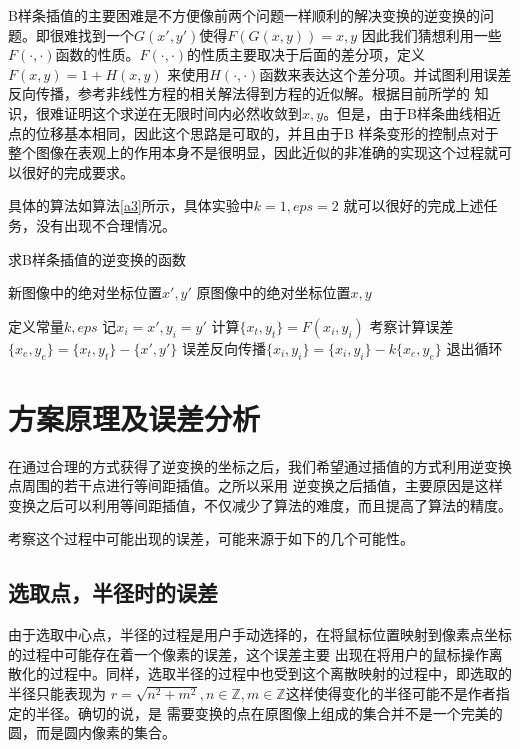 \documentclass[UTF8,a4paper]{paper}
\begin{document}
B样条插值的主要困难是不方便像前两个问题一样顺利的解决变换的逆变换的问题。即很难找到一个$G(x',y')$使得$F(G(x,y)) = x,y$
因此我们猜想利用一些$F(\cdot,\cdot)$函数的性质。$F(\cdot,\cdot)$的性质主要取决于后面的差分项，定义$F(x,y) = 1 + H(x,y)$
来使用$H(\cdot,\cdot)$函数来表达这个差分项。并试图利用误差反向传播，参考非线性方程的相关解法得到方程的近似解。根据目前所学的
知识，很难证明这个求逆在无限时间内必然收敛到$x,y$。但是，由于B样条曲线相近点的位移基本相同，因此这个思路是可取的，并且由于B
样条变形的控制点对于整个图像在表观上的作用本身不是很明显，因此近似的非准确的实现这个过程就可以很好的完成要求。

具体的算法如算法\ref{a3}所示，具体实验中$k = 1,eps = 2$ 就可以很好的完成上述任务，没有出现不合理情况。
\begin{algorithm}[h]\caption{求B样条插值的逆变换的函数}\label{a3}\begin{algorithmic}
    \Require 新图像中的绝对坐标位置$x',y'$
    \Ensure 原图像中的绝对坐标位置$x,y$\end{algorithmic}\begin{algorithmic}[1]
    \State 定义常量$k,eps$
    \State 记$x_i = x',y_i = y'$
    \State 计算$\{x_t,y_t\} = F(x_i,y_i)$
    \State 考察计算误差$\{x_e,y_e\} = \{x_t,y_t\} - \{x',y'\}$
    \State 误差反向传播$\{x_i,y_i\} = \{x_i,y_i\} - k\{x_e,y_e\}$
        \State 退出循环
    \EndIf
    \EndFor
    \EndFunction
\end{algorithmic}\end{algorithm}
\section{方案原理及误差分析}
在通过合理的方式获得了逆变换的坐标之后，我们希望通过插值的方式利用逆变换点周围的若干点进行等间距插值。之所以采用
逆变换之后插值，主要原因是这样变换之后可以利用等间距插值，不仅减少了算法的难度，而且提高了算法的精度。

考察这个过程中可能出现的误差，可能来源于如下的几个可能性。
\subsection{选取点，半径时的误差}
由于选取中心点，半径的过程是用户手动选择的，在将鼠标位置映射到像素点坐标的过程中可能存在着一个像素的误差，这个误差主要
出现在将用户的鼠标操作离散化的过程中。同样，选取半径的过程中也受到这个离散映射的过程中，即选取的半径只能表现为
$r = \sqrt{n^2 + m^2},n \in \mathbb{Z}, m \in\mathbb{Z}$这样使得变化的半径可能不是作者指定的半径。确切的说，是
需要变换的点在原图像上组成的集合并不是一个完美的圆，而是圆内像素的集合。
\end{document}
